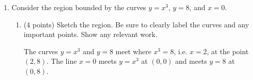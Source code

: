 \documentclass[12pt]{article}
\renewcommand{\emph}[1]{\textsf{\textbf{#1}}}
\begin{document}
\begin{enumerate}
\begin{enumerate}
  \item (6 points) Find the area of the region bounded by the curves.

    \begin{solution}
      Integrating in $x$, the top curve changes at $x=1$, so the area splits
      into two pieces:
      \[
        A \;=\; \int_0^1 x^2\,dx \;+\; \int_1^2 (-x+2)\,dx .
      \]
      Evaluating each piece,
      \begin{align*}
        \int_0^1 x^2\,dx
          &\;=\; \left[\frac{x^3}{3}\right]_0^1 \;=\; \frac13 ,\\[4pt]
        \int_1^2 (-x+2)\,dx
          &\;=\; \left[-\frac{x^2}{2}+2x\right]_1^2
           \;=\; (-2+4)-\left(-\tfrac12+2\right) \;=\; \frac12 .
      \end{align*}
      Therefore
      \[
        \boxed{\,A \;=\; \frac13+\frac12 \;=\; \frac56\,}.
      \]

      \medskip
      \emph{Alternative (integrating in $y$).}  Here $\sqrt{y}\le x\le 2-y$, so
      \[
        A=\int_0^1\Big[(2-y)-\sqrt{y}\,\Big]dy
        =\left[2y-\frac{y^2}{2}-\frac23 y^{3/2}\right]_0^1
        =2-\frac12-\frac23=\frac56 . \quad\checkmark
      \]
    \end{solution}
  \end{enumerate}

  \newpage

\item Consider the region bounded by the curves $y=x^3$, $y=8$, and
  $x=0$.
  \begin{enumerate}
  \item (4 points) Sketch the region. Be sure to clearly label the curves and any important points. Show any relevant work.

    \begin{solution}
      The curves $y=x^3$ and $y=8$ meet where $x^3=8$, i.e. $x=2$, at the point
      $(2,8)$.  The line $x=0$ meets $y=x^3$ at $(0,0)$ and meets $y=8$ at
      $(0,8)$.


\end{solution}
\end{enumerate}
\end{enumerate}
\end{document}

